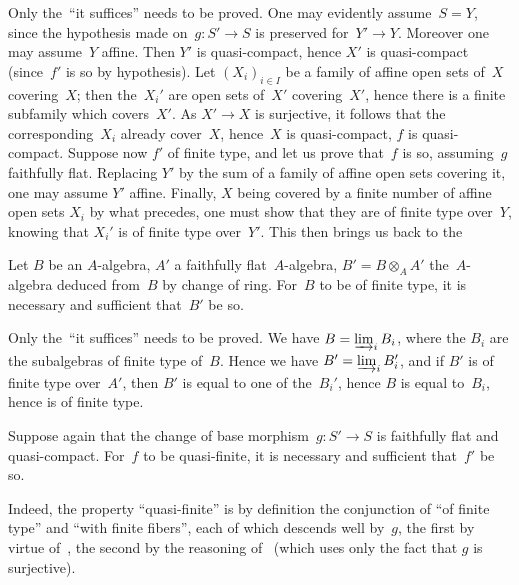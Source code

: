Only
the~``it suffices'' needs to be proved. One may evidently
assume~$S=Y$, since the hypothesis made on~$g\colon S'\to S$ is
preserved for~$Y'\to Y$. Moreover one may assume~$Y$ affine. Then
$Y'$ is quasi-compact, hence $X'$ is quasi-compact (since~$f'$ is so
by hypothesis). Let $(X_{i})_{i\in I}$ be a family of affine open
sets of~$X$ covering~$X$; then the~$X_{i}'$ are open sets of~$X'$
covering~$X'$, hence there is a finite subfamily which covers~$X'$.
As $X'\to X$ is surjective, it follows that the corresponding~$X_{i}$
already cover~$X$, hence~$X$ is quasi-compact, \ie $f$ is
quasi-compact. Suppose now $f'$ of finite type, and let us prove
that~$f$ is so, assuming~$g$ faithfully flat. Replacing $Y'$ by the
sum of a family of affine open sets covering it, one may assume $Y'$
affine. Finally, $X$ being covered by a finite number of affine open
sets $X_{i}$ by what precedes, one must show that they are of finite
type over~$Y$, knowing that $X_{i}'$ is of finite type over~$Y'$.
This then brings us back to the

\begin{corollary}
\label{VIII.3.4}
Let $B$ be an $A$-algebra, $A'$ a faithfully flat~$A$-algebra,
$B'=B\otimes_{A}A'$ the~$A$-algebra deduced from~$B$ by change of
ring. For~$B$ to be of finite type, it is necessary and sufficient
that~$B'$ be so.
\end{corollary}

Only the~``it suffices'' needs to be proved. We have
$B=\varinjlim_i B_{i}$, where the $B_{i}$ are the subalgebras of
finite type of~$B$. Hence we have
$B'=\varinjlim_i B_{i}'$, and if $B'$ is of finite type
over~$A'$, then $B'$ is equal to one of the~$B_{i}'$, hence $B$ is
equal to~$B_{i}$, hence is of finite type.

\begin{corollary}
\label{VIII.3.5}
Suppose again that the change of base morphism~$g\colon S'\to S$ is
faithfully flat and quasi-compact. For~$f$ to be quasi-finite, it is
necessary and sufficient that~$f'$ be so.
\end{corollary}

Indeed, the property ``quasi-finite'' is by definition the
conjunction of ``of finite type'' and ``with finite fibers'', each
of which descends well by~$g$, the first by virtue
of~, the second by the reasoning of~
(which uses only the fact that $g$ is surjective).

